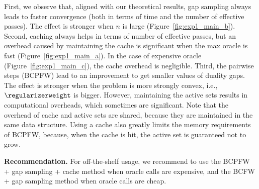 \documentclass{article}
\begin{document}
%
%
%
%
%
%
%

First, we observe that, aligned with our theoretical results, gap sampling always leads to faster convergence (both in terms of time and the number of effective passes).
The effect is stronger when $n$ is large (Figure~\ref{fig:exp1_main_b}).
%
Second, caching always helps in terms of number of effective passes, but an overhead caused by maintaining the cache is significant when the max oracle is fast (Figure~\ref{fig:exp1_main_a}).
In the case of expensive oracle (Figure~\ref{fig:exp1_main_c}), the cache overhead is negligible.
Third, the pairwise steps (BCPFW) lead to an improvement to get smaller values of duality gaps.
The effect is stronger when the problem is more strongly convex, i.e., $\regularizerweight$ is bigger. However, maintaining the active sets results in computational overheads, which sometimes are significant.
Note that the overhead of cache and active sets are shared, because they are maintained in the same data structure.
Using a cache also greatly limits the memory requirements of BCPFW, because, when the cache is hit, the active set is guaranteed not to grow.

\textbf{Recommendation.} For off-the-shelf usage, we recommend to use the BCPFW + gap sampling + cache method when oracle calls are expensive, and the BCFW + gap sampling method when oracle calls are cheap.

%
%
%
%
%
%
%
%

%
%
%
%
%
%
%
%
%
%
%
%
%
%

%
%
%
%
%
%
%
%
%
%
%

\vspace{-2mm}
\end{document}
